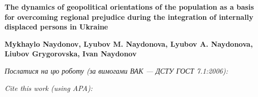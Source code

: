\documentclass[a4paper,14pt,article]{memoir}
\newcommand{\articleTitleUkr}{
	The dynamics of geopolitical orientations of the population as a basis for overcoming regional prejudice during the integration of internally displaced persons in Ukraine}
\renewcommand{\authorFullNameUkr}{Mykhaylo Naydonov, Lyubov M. Naydonova, Lyubov A. Naydonova, Liubov Grygorovska, Ivan Naydonov}
\begin{document}
	
	\begin{center}
		\par\textbf{\MakeUppercase\articleTitleUkr}
		\par\textbf{\authorFullNameUkr}
	\end{center}
	
	\par\bigskip\textit{Послатися на цю роботу (за вимогами ВАК --- ДСТУ ГОСТ 7.1:2006):}
	\par{}
	\par\bigskip\textit{Cite this work (using APA):}
	\par{}
	
	
	
\end{document}
